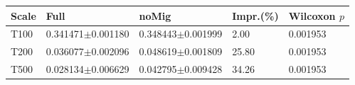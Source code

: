\begin{tabular}{lllll}
\hline
Scale & Full & noMig & Impr.(\%) & Wilcoxon $p$ \\
\hline
T100 & 0.341471$\pm$0.001180 & 0.348443$\pm$0.001999 & 2.00 & 0.001953 \\
T200 & 0.036077$\pm$0.002096 & 0.048619$\pm$0.001809 & 25.80 & 0.001953 \\
T500 & 0.028134$\pm$0.006629 & 0.042795$\pm$0.009428 & 34.26 & 0.001953 \\
\hline
\end{tabular}
